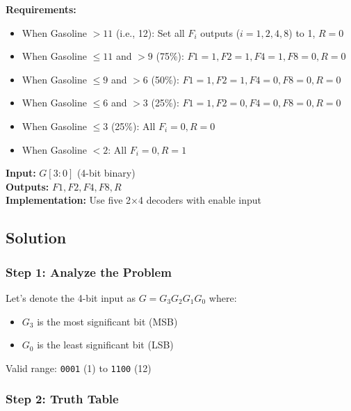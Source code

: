 \documentclass[12pt,a4paper]{article}
\newcommand{\bitvec}[1]{\texttt{#1}}
\begin{document}
\textbf{Requirements:}
\begin{itemize}
  \item When Gasoline $> 11$ (i.e., 12): Set all $F_i$ outputs ($i=1,2,4,8$) to 1, $R=0$
  \item When Gasoline $\leq 11$ and $> 9$ (75\%): $F1=1, F2=1, F4=1, F8=0, R=0$
  \item When Gasoline $\leq 9$ and $> 6$ (50\%): $F1=1, F2=1, F4=0, F8=0, R=0$
  \item When Gasoline $\leq 6$ and $> 3$ (25\%): $F1=1, F2=0, F4=0, F8=0, R=0$
  \item When Gasoline $\leq 3$ (25\%): All $F_i=0, R=0$
  \item When Gasoline $< 2$: All $F_i=0, R=1$
\end{itemize}

\textbf{Input:} $G[3:0]$ (4-bit binary)\\
\textbf{Outputs:} $F1, F2, F4, F8, R$\\
\textbf{Implementation:} Use five 2×4 decoders with enable input

\subsection{Solution}

\subsubsection{Step 1: Analyze the Problem}

Let's denote the 4-bit input as $G = G_3G_2G_1G_0$ where:
\begin{itemize}
  \item $G_3$ is the most significant bit (MSB)
  \item $G_0$ is the least significant bit (LSB)
\end{itemize}

Valid range: \bitvec{0001} (1) to \bitvec{1100} (12)

\subsubsection{Step 2: Truth Table}
\end{document}
